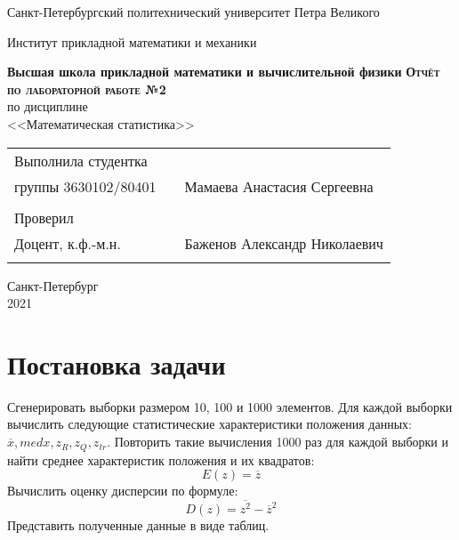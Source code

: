 \documentclass{article}
\begin{document}
\begin{titlepage}
  \begin{center}
    \large
    Санкт-Петербургский политехнический университет Петра Великого
    
    Институт прикладной математики и механики
    
    \textbf{Высшая школа прикладной математики и вычислительной физики}
    \vfill
    \textsc{\textbf{\large{Отчёт по лабораторной работе №2}}}\\[5mm]
     по дисциплине\\ <<Математическая статистика>>\\
\end{center}

\vfill

\begin{tabular}{l p{} l}
Выполнила студентка \\группы 3630102/80401 && Мамаева Анастасия Сергеевна \\
\\
Проверил\\Доцент, к.ф.-м.н.& \hspace{0pt} &   Баженов Александр Николаевич \\\\
\end{tabular}

\hfill \break
\hfill \break
\begin{center} Санкт-Петербург \\2021 \end{center}
\thispagestyle{empty}
\end{titlepage}
\newpage
\newpage
\begin{center}
    \setcounter{page}{2}
    \tableofcontents
\end{center}
\newpage
\begin{center}
    \setcounter{page}{3}
    \listoftables
\end{center}

\newpage
\section {Постановка задачи}
\noindent Сгенерировать выборки размером 10, 100 и 1000 элементов.
Для каждой выборки вычислить следующие статистические характеристики положения данных: $\overline{x}, med x, z_R, z_Q, z_{tr}.$ Повторить такие вычисления 1000 раз для каждой выборки и найти среднее характеристик положения и их квадратов:
\begin{equation}
	E(z) = \overline{z}
\end{equation}
Вычислить оценку дисперсии по формуле:
\begin{equation}
	D(z) = \overline{z^2} - \overline{z}^2
\end{equation}
Представить полученные данные в виде таблиц.
\end{document}
